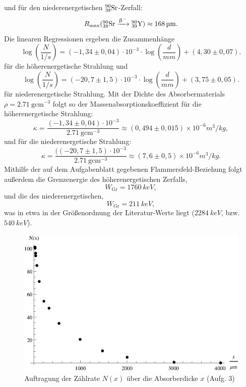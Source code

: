 und für den niederenergetischen $\element{Sr}{38}{90}$-Zerfall:
\begin{equation}
R_\mathrm{max} (\element{Sr}{38}{90} \xrightarrow{\upbeta^-} \element{Y}{39}{90}) \approx \SI{168}{\micro\meter}.
\end{equation}
Die linearen Regressionen ergeben die Zusammenhänge
\begin{equation}
\log\left(\frac{N}{\si{1/s}}\right) = (-1,34 \pm 0,04) \cdot 10^{-3} \cdot \log\left(\frac{d}{\si{mm}}\right) + (4,30 \pm 0,07).
\end{equation}
für die höherenergetische Strahlung und
\begin{equation}
\log\left(\frac{N}{\si{1/s}}\right) = (-20,7 \pm 1,5) \cdot 10^{-3} \cdot \log\left(\frac{d}{\si{mm}}\right) + (3,75 \pm 0,05).
\end{equation}
für niederenergetische Strahlung. Mit der Dichte des Absorbermaterials $\rho=\SI{2,71}{\gram\centi\meter^{-3}}$ folgt so der Massenabsorptionskoeffizient für die höherenergetische Strahlung:
\begin{equation}
\kappa = \frac{(-1,34 \pm 0,04) \cdot 10^{-3}}{\SI{2,71}{\gram\centi\meter^{-3}}} \approx (0,494 \pm 0,015) \times 10^{-6} \si{m^3/kg},
\end{equation}
und für die niederenergetische Strahlung:
\begin{equation}
\kappa = \frac{((-20,7 \pm 1,5) \cdot 10^{-3}}{\SI{2,71}{\gram\centi\meter^{-3}}} \approx (7,6 \pm 0,5) \times 10^{-6} \si{m^3/kg}.
\end{equation}
Mithilfe der auf dem Aufgabenblatt gegebenen Flammersfeld-Beziehung folgt außerdem die Grenzenergie des höherenergetischen Zerfalls,
\begin{equation}
W_\mathrm{Gr} = \SI{1760}{keV},
\end{equation}
und die des niederenergetischen,
\begin{equation}
W_\mathrm{Gr} = \SI{211}{keV},
\end{equation}
was in etwa in der Größenordnung der Literatur-Werte liegt ($\SI{2284}{keV}$, bzw. $\SI{540}{keV}$).

\begin{figure}[ht]
\centering
\includegraphics[scale=1.0]{fig/iii_3_plota.eps}
\caption{Auftragung der Zählrate $N(x)$ über die Absorberdicke $x$ (Aufg. 3)}
\label{fig:iii_3_plota}
\end{figure}

